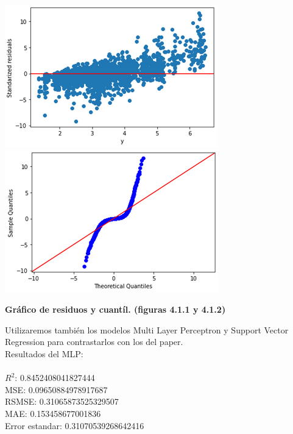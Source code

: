 \documentclass{article}
\begin{document}
            \includegraphics[scale=0.5]{images/residuos-stage-randomforest1.PNG} 
            \includegraphics[scale=0.5]{images/residuos-stage-quantil1.PNG} \\
            \begin{center}
                \textbf{Gráfico de residuos y cuantíl. (figuras 4.1.1 y 4.1.2)}
            \end{center}
                
        
        Utilizaremos también los modelos Multi Layer Perceptron y Support Vector Regression para contrastarlos con los del paper.\\
        Resultados del MLP:\\
            \\
        $R^2$:  0.8452408041827444\\
        MSE:  0.09650884978917687\\
        RSMSE:  0.31065873525329507\\
        MAE:  0.153458677001836\\
        Error estandar:  0.31070539268642416\\
    
\end{document}
